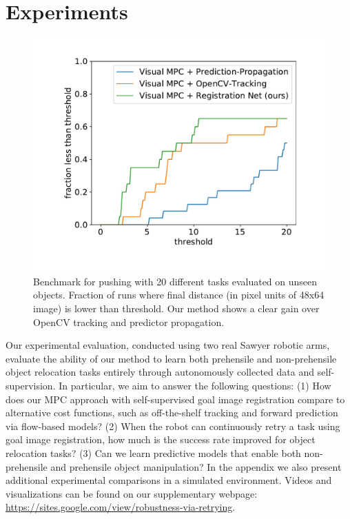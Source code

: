 
\vspace{-0.1cm}
\section{Experiments}
\vspace{-0.2cm}

\begin{figure}
\vspace{-0.4in}
\centering
\includegraphics[width=0.35\columnwidth]{images/pushlong_bench_same_range.pdf}
\vspace{-0.9cm}
\caption{\small{Benchmark for pushing with 20 different tasks evaluated on unseen objects. Fraction of runs where final distance (in pixel units of 48x64 image) is lower than threshold. Our method shows a clear gain over OpenCV tracking and predictor propagation.}}
\label{fig:push_bench_long}
\vspace{-0.1in}
\end{figure}


Our experimental evaluation, conducted using two real Sawyer robotic arms, evaluate the ability of our method to learn both prehensile and non-prehensile object relocation tasks entirely through autonomously collected data and self-supervision. In particular, we aim to answer the following questions: (1) How does our MPC approach with self-supervised goal image registration compare to alternative cost functions, such as off-the-shelf tracking and forward prediction via flow-based models? (2) When the robot can continuously retry a task using goal image registration, how much is the success rate improved for object relocation tasks? (3) Can we learn predictive models that enable both non-prehensile and prehensile object manipulation? In the appendix we also present additional experimental comparisons in a simulated environment.
Videos and visualizations can be found on our supplementary webpage: \url{https://sites.google.com/view/robustness-via-retrying}.

